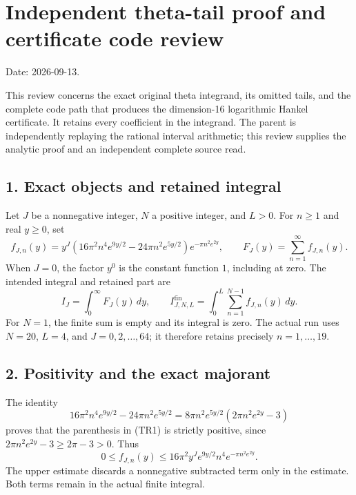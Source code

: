 \section{Independent theta-tail proof and certificate code review}\label{C47stage:TR:independent-theta-tail-proof-and-certificate-code-review}

Date: 2026-09-13.

This review concerns the exact original theta integrand, its omitted tails, and the complete code path that produces the dimension-16 logarithmic Hankel certificate. It retains every coefficient in the integrand. The parent is independently replaying the rational interval arithmetic; this review supplies the analytic proof and an independent complete source read.

\subsection{1. Exact objects and retained integral}\label{C47stage:TR:exact-objects-and-retained-integral}

Let \(J\) be a nonnegative integer, \(N\) a positive integer, and \(L>0\). For \(n\geq1\) and real \(y\geq0\), set \[
 f_{J,n}(y)=y^J
 \left(16\pi^2n^4e^{9y/2}-24\pi n^2e^{5y/2}\right)
 e^{-\pi n^2e^{2y}},
 \qquad F_J(y)=\sum_{n=1}^{\infty}f_{J,n}(y).
 \tag{TR1}
\] When \(J=0\), the factor \(y^0\) is the constant function \(1\), including at zero. The intended integral and retained part are \[
 I_J=\int_0^\infty F_J(y)\,dy,\qquad
 I_{J,N,L}^{\mathrm{fin}}=\int_0^L\sum_{n=1}^{N-1}f_{J,n}(y)\,dy.
 \tag{TR2}
\] For \(N=1\), the finite sum is empty and its integral is zero. The actual run uses \(N=20\), \(L=4\), and \(J=0,2,\ldots,64\); it therefore retains precisely \(n=1,\ldots,19\).

\subsection{2. Positivity and the exact majorant}\label{C47stage:TR:positivity-and-the-exact-majorant}

The identity \[
 16\pi^2n^4e^{9y/2}-24\pi n^2e^{5y/2}
 =8\pi n^2e^{5y/2}(2\pi n^2e^{2y}-3)
 \tag{TR3}
\] proves that the parenthesis in (TR1) is strictly positive, since \(2\pi n^2e^{2y}-3\geq2\pi-3>0\). Thus \[
 0\leq f_{J,n}(y)
 \leq16\pi^2y^Je^{9y/2}n^4e^{-\pi n^2e^{2y}}.
 \tag{TR4}
\] The upper estimate discards a nonnegative subtracted term only in the estimate. Both terms remain in the actual finite integral.


